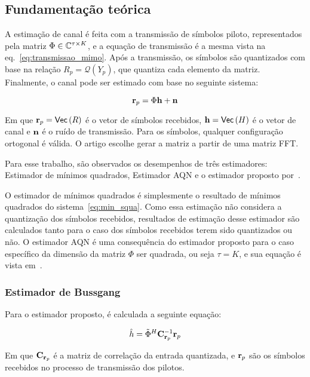 \documentclass{article}
\begin{document}
\subsection{Fundamentação teórica}

A estimação de canal é feita com a transmissão de símbolos piloto, representados pela matriz $\Phi\in\mathbb{C}^{\tau\times K}$, e a equação de transmissão é a mesma vista na eq.~\eqref{eq:transmissao_mimo}. Após a transmissão, os símbolos são quantizados com base na relação $R_p=\mathcal{Q}(Y_p)$, que quantiza cada elemento da matriz. Finalmente, o canal pode ser estimado com base no seguinte sistema:

\begin{equation}
    \label{eq:min_squa}
    \mathbf{r}_p = \Phi\mathbf{h} + \mathbf{n}
\end{equation}

Em que $\mathbf{r}_p= \mathsf{Vec} \left( R \right) $ é o vetor de símbolos recebidos, $\mathbf{h}= \mathsf{Vec} \left( H \right) $ é o vetor de canal e $\mathbf{n}$ é o ruído de transmissão. Para os símbolos, qualquer configuração ortogonal é válida. O artigo escolhe gerar a matriz a partir de uma matriz FFT.  

Para esse trabalho, são observados os desempenhos de três estimadores: Estimador de mínimos quadrados, Estimador AQN e o estimador proposto por~\cite{li.etal_2017a}. 

O estimador de mínimos quadrados é simplesmente o resultado de mínimos quadrados do sistema~\eqref{eq:min_squa}. Como essa estimação não considera a quantização dos símbolos recebidos, resultados de estimação desse estimador são calculados tanto para o caso dos símbolos recebidos terem sido quantizados ou não. O estimador AQN é uma consequência do estimador proposto para o caso específico da dimensão da matriz $\Phi$ ser quadrada, ou seja $\tau=K$, e sua equação é vista em~\cite[eq. 16]{li.etal_2017a}.

\subsubsection{Estimador de Bussgang}

Para o estimador proposto, é calculada a seguinte equação:

\begin{equation}
    \hat{h} = \tilde{\Phi}^H\mathbf{C}_{\mathbf{r}_p}^{-1}\mathbf{r}_p       
    \label{eq:estimador_proposto}
\end{equation}

Em que $\mathbf{C}_{\mathbf{r}_p}$ é a matriz de correlação da entrada quantizada, e $\mathbf{r}_p$ são os símbolos recebidos no processo de transmissão dos pilotos.
\end{document}
